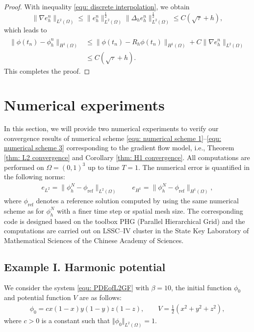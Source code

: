 \documentclass{siamart250211}
\begin{document}
\begin{proof}
	With inequality \eqref{equ: discrete interpolation}, we obtain
	\begin{equation*}
		\|\nabla e_h^n\|_{L^2(\Omega)} \le \|e_h^n\|_{L^2(\Omega)}^{\frac12}\|\Delta_h e_h^n\|_{L^2(\Omega)}^{\frac12} \le C (\sqrt{\tau} + h),
	\end{equation*}
	which leads to 
	\begin{align*}
		\|\phi(t_n) - \phi_h^n\|_{H^1(\Omega)} & \le  \| \phi(t_n) - \widehat{R_h\phi(t_n)}\|_{H^1(\Omega)} + C \|\nabla e_h^n\|_{L^2(\Omega)} \\
		& \le C (\sqrt{\tau} + h).
	\end{align*}
	This completes the proof.
\end{proof}

\section{Numerical experiments}\label{sec: numerical experiments}

In this section, we will provide two numerical experiments to verify our convergence results of numerical scheme \eqref{equ: numerical scheme 1}--\eqref{equ: numerical scheme 3} corresponding to the gradient flow model, i.e., Theorem \ref{thm: L2 convergence} and Corollary \ref{thm: H1 convergence}. All computations are performed on $\Omega  = (0,1)^3$ up to time $T = 1$. The numerical error is quantified in the following norms: 
\begin{align*}
    e_{L^2} = \|\phi_h^N - \phi_{\text{ref}}\|_{L^2(\Omega)} \qquad e_{H^1} = \|\phi_h^N - \phi_{\text{ref}}\|_{H^1(\Omega)},
\end{align*}
where $\phi_{\text{ref}}$ denotes a reference solution computed by using the same numerical scheme as for $\phi_h^N$ with a finer time step or spatial mesh size. The corresponding code is designed based on the toolbox PHG (Parallel Hierarchical Grid) \cite{PHG} and the computations are carried out on LSSC--IV cluster in the State Key Laboratory of Mathematical Sciences of the Chinese Academy of
Sciences.

\subsection{Example I. Harmonic potential}

We consider the system \eqref{equ: PDEofL2GF} with $\beta =10$, the initial function $\phi_0$ and potential function $V$ are as follows:
\begin{equation}
   \begin{aligned}
       \phi_0 =cx(1-x)y(1-y)z(1-z), \qquad
        V=\frac{1}{2}(x^2+y^2+z^2),
   \end{aligned}
\end{equation}
where $c>0$ is a constant such that $\Vert\phi_0\Vert_{L^2(\Omega)}=1$.
\end{document}

